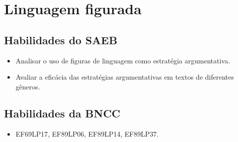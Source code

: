 \chapter{Linguagem figurada}

\section{Habilidades do SAEB}

\begin{itemize}
\item Analisar o uso de figuras de linguagem como estratégia argumentativa.

\item Avaliar a eficácia das estratégias argumentativas em textos de
diferentes gêneros.
\end{itemize}

\section{Habilidades da BNCC}

\begin{itemize}
\item EF69LP17, EF89LP06, EF89LP14, EF89LP37.
\end{itemize}

